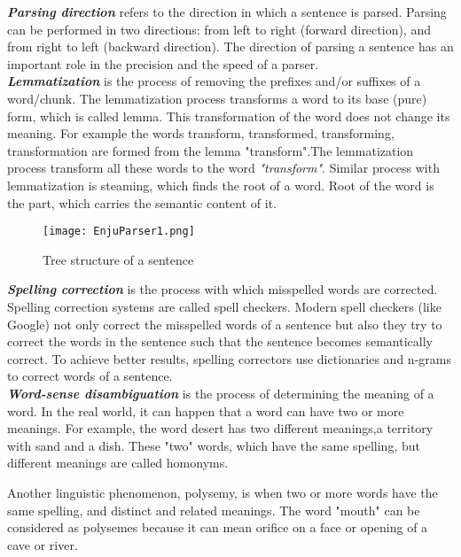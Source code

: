 \emph{ \textbf{Parsing direction}} refers to the direction in which a sentence is parsed. Parsing can be performed in two directions: from left to right (forward direction), and from right to left (backward direction). The direction of parsing a sentence has an important role in the precision and the speed of a parser. \\

\emph{\textbf{Lemmatization}} is the process of removing the prefixes and/or suffixes of a word/chunk. The lemmatization process transforms a word to its base (pure) form, which is called lemma. This transformation of the word does not change its meaning. For example the words transform, transformed, transforming, transformation are formed from the lemma "transform".The lemmatization process transform all these words to the word \emph{"transform"}. Similar process with lemmatization is steaming, which finds the root of a word. Root of the word is the part, which carries the semantic content of it.\\

\begin{figure}[ht]
   \begin{center} 
	 \texttt{[image: EnjuParser1.png]} 
 	 \caption[Tree structure of a sentence]{Tree structure of a sentence}
	 \label{Figure 3}
   \end{center}
\end{figure}
 
\emph{\textbf{Spelling correction}} is the process with which misspelled words are corrected. Spelling correction systems are called spell checkers. Modern spell checkers (like Google) not only correct the misspelled words of a sentence but also they try to correct the words in the sentence such that the sentence becomes semantically correct. To achieve better results, spelling correctors use dictionaries and n-grams to correct words of a sentence.\\

\emph{\textbf{Word-sense disambiguation}} is the process of determining the meaning of a word. In the real world, it can happen that a word can have two or more meanings. For example, the word desert has two different meanings,a territory with sand and a dish. These "two" words, which have the same spelling, but different meanings are called homonyms. 

Another linguistic phenomenon, polysemy, is when two or more words have the same spelling, and distinct and related meanings. The word "mouth" can be considered as polysemes because it can mean orifice on a face or opening of a cave or river. 


